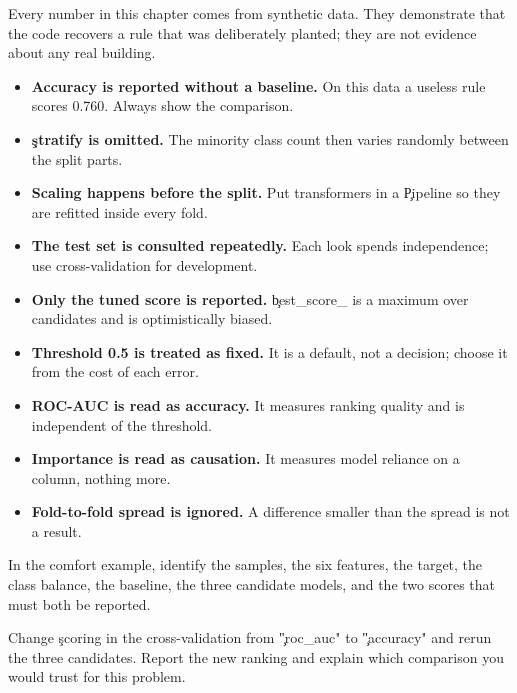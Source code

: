 Every number in this chapter comes from synthetic data. They demonstrate that
the code recovers a rule that was deliberately planted; they are not evidence
about any real building.


\begin{itemize}
    \item \textbf{Accuracy is reported without a baseline.} On this data a
          useless rule scores 0.760. Always show the comparison.
    \item \textbf{\c{stratify} is omitted.} The minority class count then varies
          randomly between the split parts.
    \item \textbf{Scaling happens before the split.} Put transformers in a
          \c{Pipeline} so they are refitted inside every fold.
    \item \textbf{The test set is consulted repeatedly.} Each look spends
          independence; use cross-validation for development.
    \item \textbf{Only the tuned score is reported.} \c{best_score_} is a maximum
          over candidates and is optimistically biased.
    \item \textbf{Threshold 0.5 is treated as fixed.} It is a default, not a
          decision; choose it from the cost of each error.
    \item \textbf{ROC-AUC is read as accuracy.} It measures ranking quality and
          is independent of the threshold.
    \item \textbf{Importance is read as causation.} It measures model reliance
          on a column, nothing more.
    \item \textbf{Fold-to-fold spread is ignored.} A difference smaller than the
          spread is not a result.
\end{itemize}



In the comfort example, identify the samples, the six features, the target, the
class balance, the baseline, the three candidate models, and the two scores that
must both be reported.


Change \c{scoring} in the cross-validation from \c{"roc_auc"} to \c{"accuracy"}
and rerun the three candidates. Report the new ranking and explain which
comparison you would trust for this problem.

